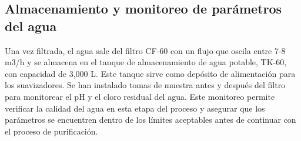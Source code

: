 \subsection{Almacenamiento y monitoreo de parámetros del agua}

Una vez filtrada, el agua sale del filtro CF-60 con un flujo que oscila entre 7-8 m3/h y se almacena en el tanque de almacenamiento de agua potable, TK-60, con capacidad de 3,000 L. Este tanque sirve como depósito de alimentación para los suavizadores. Se han instalado tomas de muestra antes y después del filtro para monitorear el pH y el cloro residual del agua. Este monitoreo permite verificar la calidad del agua en esta etapa del proceso y asegurar que los parámetros se encuentren dentro de los límites aceptables antes de continuar con el proceso de purificación.



